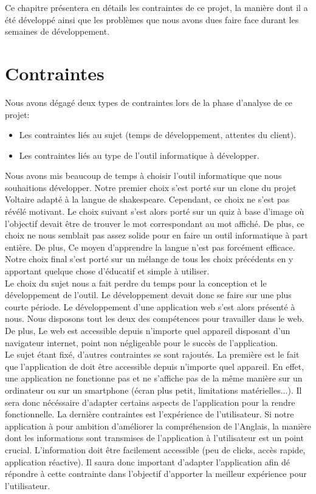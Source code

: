 \documentclass[a4paper,11pt, oneside]{book}
\begin{document}
	Ce chapitre présentera en détails les contraintes de ce projet, la manière dont il a été développé ainsi que les problèmes que nous avons dues faire face
	durant les semaines de développement.

	\section{Contraintes}

	Nous avons dégagé deux types de contraintes lors de la phase d'analyse de ce projet:
	\begin{itemize}
		\item Les contraintes liés au sujet (temps de développement, attentes du client).
		\item Les contraintes liés au type de l'outil informatique à développer.\\
	\end{itemize}
Nous avons mis beaucoup de temps à choisir l'outil informatique que nous souhaitions développer. Notre premier choix s'est porté sur un clone du projet Voltaire adapté à la langue de shakespeare.
Cependant, ce choix ne s'est pas révélé motivant. Le choix suivant s'est alors porté sur un quiz à base d'image où l'objectif devait être de trouver le mot correspondant au mot affiché. De plus, ce choix
ne nous semblait pas assez solide pour en faire un outil informatique à part entière. De plus, Ce moyen d'apprendre la langue n'est pas forcément efficace.
Notre choix final s'est porté sur un mélange de tous les choix précédents en y apportant quelque chose d'éducatif et simple à utiliser.\\

Le choix du sujet nous a fait perdre du temps pour la conception et le développement de l'outil. Le développement devait donc se faire sur une plus courte période.
Le développement d'une application web s'est alors présenté à nous. Nous disposons tout les deux des compétences pour travailler dans le web.
De plus, Le web est accessible depuis n'importe quel appareil disposant d'un navigateur internet, point non négligeable pour le succès de l'application.\\

Le sujet étant fixé, d'autres contraintes se sont rajoutés. La première est le fait que l'application de doit être accessible depuis n'importe quel appareil. En effet,
une application ne fonctionne pas et ne s'affiche pas de la même manière sur un ordinateur ou sur un smartphone (écran plus petit, limitations matérielles...). Il sera donc nécéssaire
d'adapter certains aspects de l'application pour la rendre fonctionnelle. La dernière contraintes est l'expérience de l'utilisateur. Si notre application à pour ambition d'améliorer
la compréhension de l'Anglais, la manière dont les informations sont transmises de l'application à l'utilisateur est un point crucial. L'information doit être facilement accessible (peu de clicks, accès rapide, application réactive).
Il saura donc important d'adapter l'application afin dé répondre à cette contrainte dans l'objectif d'apporter la meilleur expérience pour l'utilisateur.
\end{document}

